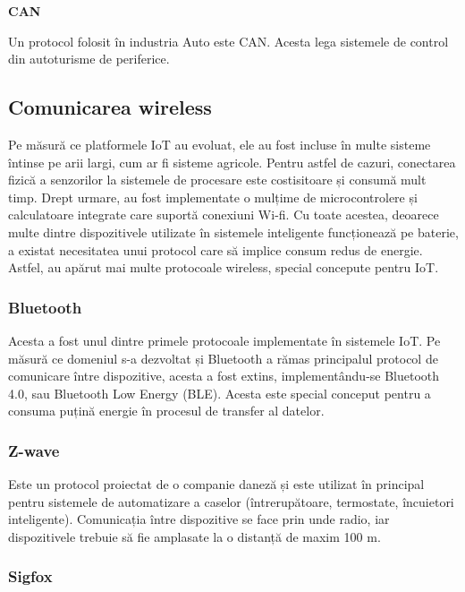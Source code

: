 \textbf{CAN}

Un protocol folosit în industria Auto este CAN. Acesta lega sistemele de control
din autoturisme de periferice.

\subsection{Comunicarea wireless}
\label{sec:embed-bus-wireless}

Pe măsură ce platformele IoT au evoluat, ele au fost incluse în multe sisteme
întinse pe arii largi, cum ar fi sisteme agricole. Pentru astfel de cazuri,
conectarea fizică a senzorilor la sistemele de procesare este costisitoare și
consumă mult timp. Drept urmare, au fost implementate o mulțime de
microcontrolere și calculatoare integrate care suportă conexiuni Wi-fi. Cu toate
acestea, deoarece multe dintre dispozitivele utilizate în sistemele inteligente
funcționează pe baterie, a existat necesitatea unui protocol care să implice
consum redus de energie. Astfel, au apărut mai multe protocoale wireless,
special concepute pentru IoT.

\subsubsection{Bluetooth}
\label{sec:embed-bus-wireless-bluetooth}

Acesta a fost unul dintre primele protocoale implementate în sistemele IoT. Pe
măsură ce domeniul s-a dezvoltat și Bluetooth a rămas principalul protocol de
comunicare între dispozitive, acesta a fost extins, implementându-se Bluetooth
4.0, sau Bluetooth Low Energy (BLE). Acesta este special conceput pentru a
consuma puțină energie în procesul de transfer al datelor.


\subsubsection{Z-wave}
\label{sec:embed-bus-wireless-zwave}

Este un protocol proiectat de o companie daneză și este utilizat în principal
pentru sistemele de automatizare a caselor (întrerupătoare, termostate,
încuietori inteligente). Comunicația între dispozitive se face prin unde radio,
iar dispozitivele trebuie să fie amplasate la o distanță de maxim 100 m.

\subsubsection{Sigfox}
\label{sec:embed-bus-wireless-sigfox}

